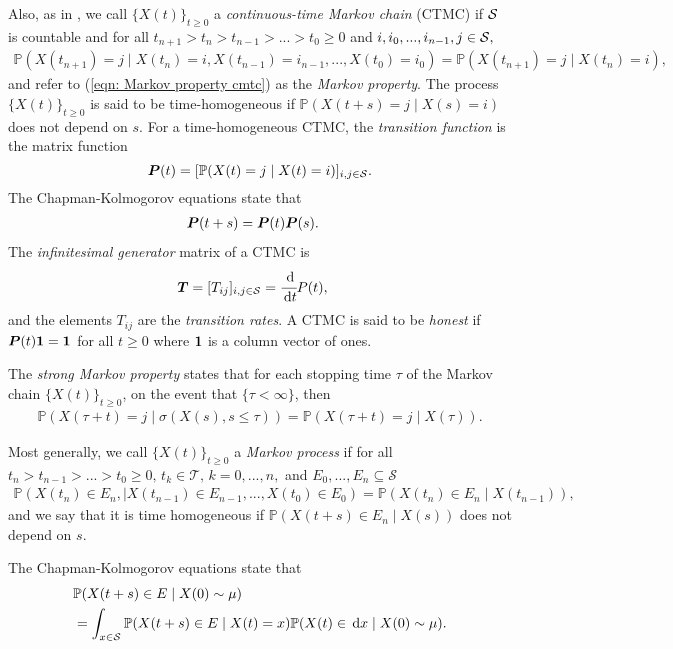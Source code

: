 Also, as in \cite[Section~1.3]{MEinAP}, we call \(\{X(t)\}_{t\geq 0}\) a \emph{continuous-time Markov chain} (CTMC) if \(\mathcal{S}\) is countable and for all \(t_{n+1} > t_n > t_{n-1} > ... > t_0 \geq 0\) and \(i,i_0,...,i_{n-1},j\in\mathcal{S},\)
\begin{align}\label{eqn: Markov property cmtc}
	\mathbb P(X(t_{n+1})=j \mid X(t_n)=i, X(t_{n-1})=i_{n-1},...,X(t_0)=i_0) = \mathbb P(X(t_{n+1})=j \mid X(t_n)=i),
\end{align}
and refer to (\ref{eqn: Markov property cmtc}) as the \emph{Markov property}. The process \(\{X(t)\}_{t\geq 0}\) is said to be time-homogeneous if 
\(\mathbb P(X(t+s)=j \mid X(s)=i)\) does not depend on \(s\). For a time-homogeneous CTMC, the \emph{transition function} is the matrix function 
\[\boldsymbol P(t) = [\mathbb P(X(t)=j \mid X(t)=i)]_{i,j\in\mathcal{S}}.\]
The Chapman-Kolmogorov equations state that 
\begin{align} 
	&\nonumber \boldsymbol P(t+s)=\boldsymbol P(t)\boldsymbol P(s).
\end{align}
The \emph{infinitesimal generator} matrix of a CTMC is 
\begin{align} 
	&\nonumber \boldsymbol T = [T_{ij}]_{i,j\in\mathcal{S}} = \cfrac{\, \mathrm{d}}{\, \mathrm{d} t}P(t),
\end{align}
and the elements \(T_{ij}\) are the \emph{transition rates}. A CTMC is said to be \emph{honest} if \(\boldsymbol P(t)\boldsymbol 1=\boldsymbol 1\) for all \(t\geq 0\) where \(\boldsymbol 1\) is a column vector of ones. 

The \emph{strong Markov property} states that for each stopping time \(\tau\) of the Markov chain \(\{X(t)\}_{t\geq 0}\), on the event that \(\{\tau<\infty\}\), then 
\begin{align}\label{eqn: strong Markov property ctmc}
	\mathbb P(X(\tau + t)=j \mid \sigma(X(s),s\leq \tau)) = \mathbb P(X(\tau+t)=j \mid X(\tau)).
\end{align}

Most generally, we call \(\{X(t)\}_{t\geq 0}\) a \emph{Markov process} if for all \(t_n > t_{n-1} > ... > t_0 \geq 0,\, t_k\in\mathcal T,\, k=0,...,n,\) and \(E_0,...,E_n\subseteq \mathcal S\)
\begin{align}\label{eqn: Markov process}
	\mathbb P(X(t_n)\in E_n,\mid X(t_{n-1})\in E_{n-1},...,X(t_0)\in E_0) 
	= \mathbb P(X(t_n)\in E_n\mid X(t_{n-1})),
\end{align}
and we say that it is time homogeneous if \(\mathbb P(X(t+s)\in E_n\mid X(s))\) does not depend on \(s\). 

The Chapman-Kolmogorov equations state that 
\begin{align}\label{eqn: CK}
	&\nonumber \mathbb P(X(t+s)\in E\mid X(0)\sim \mu) 
	\\&= \int_{x\in\mathcal{S}}\mathbb P(X(t+s)\in E\mid X(t)=x)\mathbb P(X(t)\in \, \mathrm{d} x\mid X(0)\sim \mu).
\end{align}

